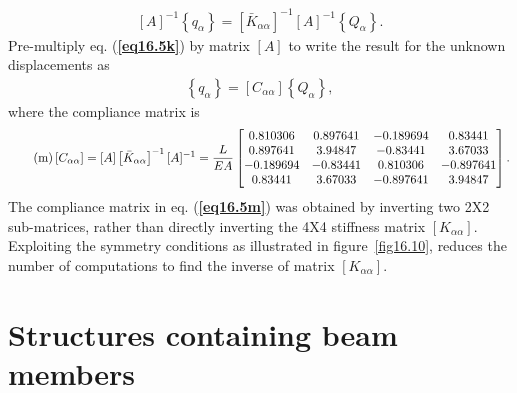 \documentclass{AeroStructure-ERJohnson}
\begin{document}
\begin{example}
\begin{align}\label{eq16.5k}\tag{k}
[A]^{-1}\left\{q_{\alpha}\right\}=\left[\bar{K}_{\alpha \alpha}\right]^{-1}[A]^{-1}\left\{Q_{\alpha}\right\}.
\end{align}
Pre-multiply eq. (\textbf{\ref{eq16.5k}}) by matrix $[A]$ to write the result for the unknown displacements as
\begin{align}\label{eq16.5l}\tag{l}
\left\{q_{\alpha}\right\}=\left[C_{\alpha \alpha}\right]\left\{Q_{\alpha}\right\},
\end{align}
where the compliance matrix is
\begin{align}\label{eq16.5m}\tag{m}
\left[C_{\alpha \alpha}\right]=[A]\left[\bar{K}_{\alpha \alpha}\right]^{-1}[A]^{-1}=\frac{L}{E A}\left[\begin{array}{@{}cccc@{}}0.810306 & 0.897641 & -0.189694 & 0.83441 \\0.897641 & 3.94847 & -0.83441 & 3.67033 \\-0.189694 & -0.83441 & 0.810306 & -0.897641 \\0.83441 & 3.67033 & -0.897641 & 3.94847\end{array}\right].
\end{align}
The compliance matrix in eq. (\textbf{\ref{eq16.5m}}) was obtained by inverting two 2X2 sub-matrices, rather than directly inverting the 4X4 stiffness matrix $\left[K_{\alpha \alpha}\right]$. Exploiting the symmetry conditions as illustrated in figure~\ref{fig16.10}, reduces the number of computations to find the inverse of matrix $\left[K_{\alpha \alpha}\right]$.
\end{example}

\vspace*{-1pc}

\section{Structures containing beam members}\label{sec16.2}
\end{document}
